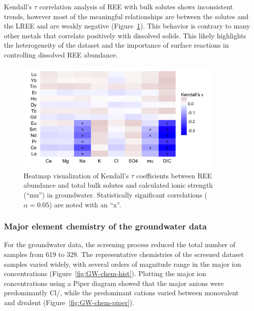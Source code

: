 Kendall's $\tau$ correlation analysis of REE with bulk solutes shows inconsistent trends, however most of the meaningful relationships are between the solutes and the LREE and are weakly negative (Figure~\ref{fig:REE-vs-major}).
This behavior is contrary to many other metals that correlate positively with dissolved solids.
This likely highlights the heterogeneity of the dataset and the importance of surface reactions in controlling dissolved REE abundance.

\begin{figure}[htbp]
\begin{center}
\includegraphics[width=0.9\textwidth]{Ch3_figures/REE-vs-chem.png}
\caption{Heatmap visualization  of Kendall's $\tau$ coefficients between REE abundance and total bulk solutes and calculated ionic strength (``mu'') in groundwater.
Statistically significant correlations ($\alpha = 0.05$) are noted with an ``x''.}\label{fig:REE-vs-major}
\end{center}
\end{figure}

\subsubsection{Major element chemistry of the groundwater data}

For the groundwater data, the screening process reduced the total number of samples from 619 to 328.
The representative chemistries of the screened dataset samples varied widely, with several orders of magnitude range in the major ion concentrations (Figure~\ref{fig:GW-chem-hist}).
Plotting the major ion concentrations using a Piper diagram \citep{Piper_diag} showed that the major anions were predominantly Cl/, while the predominant cations varied between monovalent and divalent (Figure~\ref{fig:GW-chem-piper}).

